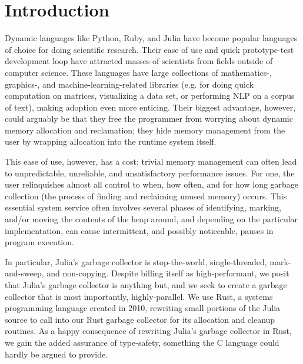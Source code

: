 \section{Introduction} \label{introduction}
Dynamic languages like Python, Ruby, and Julia have become popular languages of choice for doing scientific research.
Their ease of use and quick prototype-test development loop have attracted masses of scientists from fields outside of computer science.
These languages have large collections of mathematics-, graphics-, and machine-learning-related libraries (e.g. for doing quick computation on matrices, visualizing a data set, or performing NLP on a corpus of text), making adoption even more enticing.
Their biggest advantage, however, could arguably be that they free the programmer from worrying about dynamic memory allocation and reclamation; they hide memory management from the user by wrapping allocation into the runtime system itself.

This ease of use, however, has a cost; trivial memory management can often lead to unpredictable, unreliable, and unsatisfactory performance issues.
For one, the user relinquishes almost all control to when, how often, and for how long garbage collection (the process of finding and reclaiming unused memory) occurs.
This essential system service often involves several phases of identifying, marking, and/or moving the contents of the heap around, and depending on the particular implementation, can cause intermittent, and possibly noticeable, pauses in program execution.

In particular, Julia's garbage collector is stop-the-world, single-threaded, mark-and-sweep, and non-copying.
Despite billing itself as high-performant, we posit that Julia's garbage collector is anything but, and we seek to create a garbage collector that is most importantly, highly-parallel.
We use Rust, a systems programming language created in 2010, rewriting small portions of the Julia source to call into our Rust garbage collector for its allocation and cleanup routines.
As a happy consequence of rewriting Julia's garbage collector in Rust, we gain the added assurance of type-safety, something the C language could hardly be argued to provide.

